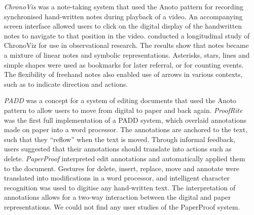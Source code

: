 \textit{ChronoVis} \citep{Fouse2011} was a note-taking system that used the Anoto pattern for recording synchronised
hand-written notes during playback of a video. An accompanying screen interface allowed users to click on the digital
display of the handwritten notes to navigate to that position in the video. %
\citet{Weibel2012} conducted a longitudinal study of ChronoViz for use in observational research. The results show that
notes became a mixture of linear notes and symbolic representations.  Asterisks, stars, lines and simple shapes were
used as bookmarks for later referral, or for counting events.  The flexibility of freehand notes also enabled use of
arrows in various contexts, such as to indicate direction and actions.

\textit{PADD} \citep{Guimbretiere2003} was a concept for a system of editing documents that used the Anoto pattern to
allow users to move from digital to paper and back again.  \textit{ProofRite} \citep{Conroy2004} was the first full
implementation of a PADD system, which overlaid annotations made on paper into a word processor. The annotations are 
anchored to the text, such that they ``reflow'' when the text is moved.  Through informal feedback, users suggested
that their annotations should translate into actions such as delete.  \textit{PaperProof} \citep{Weibel2008}
interpreted edit annotations and automatically applied them to the document.  Gestures for delete, insert, replace,
move and annotate were translated into modifications in a word processor, and intelligent character recognition was
used to digitise any hand-written text. The interpretation of annotations allows for a two-way interaction between the
digital and paper representations. We could not find any user studies of the PaperProof system.



